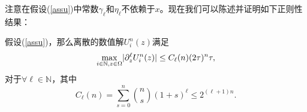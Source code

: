注意在假设(\ref{assu})中常数$\gamma_\ell$和$\eta_\ell$不依赖于$x$。现在我们可以陈述并证明如下正则性结果：
\begin{thm}\label{regularity}
  假设(\ref{assu})，那么离散的数值解$U^n_i(z)$满足
  \begin{equation}\label{reg}
    \underset{i\in\mathbb{N}, z\in\Omega}{\max}|\partial^{\ell}_z U^n_i(z)|\leq C_\ell(n)(2\tau)^n \tau,
  \end{equation}
  对于$\forall\ell\in\mathbb{N}$，其中
  \begin{equation}\label{cln}
    C_\ell(n) = \sum\limits^n_{s=0}\binom{n}{s}(1+s)^\ell\leq 2^{(\ell+1)n}.
  \end{equation}
\end{thm}
